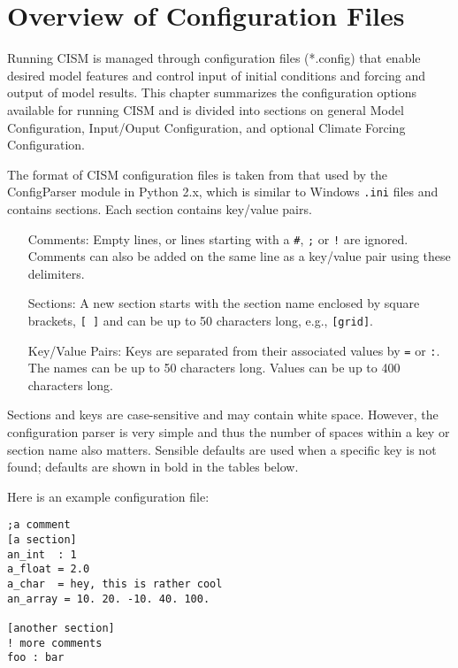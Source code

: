 \section{Overview of Configuration Files}

Running CISM is managed through configuration files (*.config) that enable 
desired model features and control input of initial conditions and forcing 
and output of model results.  This chapter summarizes the configuration options 
available for running CISM and is divided into sections on general Model Configuration, 
Input/Ouput Configuration, and optional Climate Forcing Configuration.

The format of CISM configuration files is taken from that used by the 
ConfigParser module in Python 2.x, which is similar to Windows \texttt{.ini} files 
and contains sections. Each section contains key/value pairs.

\begin{itemize}
\item[Comments:] Empty lines, or lines starting with a \texttt{\#}, \texttt{;} or \texttt{!} are ignored.  Comments can also be added on the same line as a key/value pair using these delimiters.
\item[Sections:] A new section starts with the section name enclosed by square brackets, \texttt{[ ]} and can be up to 50 characters long, e.g., \texttt{[grid]}.
\item[Key/Value Pairs:] Keys are separated from their associated values by \texttt{=} or \texttt{:}. The names can be up to 50 characters long. Values can be up to 400 characters long.
\end{itemize}

Sections and keys are case-sensitive and may contain white space. 
However, the configuration parser is very simple and thus the number of spaces 
within a key or section name also matters. Sensible defaults are used when 
a specific key is not found; defaults are shown in bold in the tables below.

Here is an example configuration file:
\begin{verbatim}
;a comment
[a section]
an_int  : 1
a_float = 2.0
a_char  = hey, this is rather cool
an_array = 10. 20. -10. 40. 100.

[another section]
! more comments
foo : bar
\end{verbatim}



